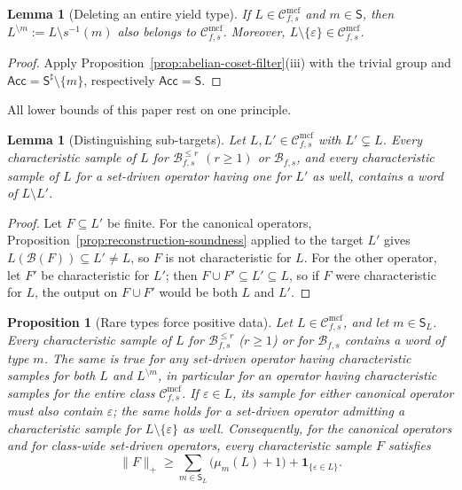 \documentclass[11pt]{article}
\numberwithin{equation}{section}
\theoremstyle{plain}
\newtheorem{lemma}[theorem]{Lemma}
\newtheorem{proposition}[theorem]{Proposition}
\theoremstyle{definition}
\theoremstyle{remark}
\newcommand{\Cmcf}[2]{\mathcal{C}^{\mathrm{mcf}}_{#1,#2}}
\newcommand{\eps}{\varepsilon}
\theoremstyle{plain}
\begin{document}
\begin{lemma}[Deleting an entire yield type]
\label{lem:type-deletion}
If $L\in\Cmcf{f}{s}$ and $m\in\mathsf S$, then
$L^{\setminus m}:=L\setminus s^{-1}(m)$ also belongs to
$\Cmcf{f}{s}$. Moreover, $L\setminus\{\eps\}\in\Cmcf{f}{s}$.
\end{lemma}

\begin{proof}
Apply Proposition~\ref{prop:abelian-coset-filter}(iii) with the trivial group and
$\mathsf{Acc}=\mathsf S^\sharp\setminus\{m\}$, respectively $\mathsf{Acc}=\mathsf S$.
\end{proof}

All lower bounds of this paper rest on one principle.

\begin{lemma}[Distinguishing sub-targets]
\label{lem:distinguishing}
Let $L,L'\in\Cmcf{f}{s}$ with $L'\subsetneq L$.  Every characteristic sample of
$L$ for $\mathcal B^{\le r}_{f,s}$ $(r\ge1)$ or $\mathcal B_{f,s}$, and every
characteristic sample of $L$ for a set-driven operator having one for $L'$ as
well, contains a word of $L\setminus L'$.
\end{lemma}

\begin{proof}
Let $F\subseteq L'$ be finite.  For the canonical operators,
Proposition~\ref{prop:reconstruction-soundness} applied to the target $L'$ gives
$L(\mathcal B(F))\subseteq L'\ne L$, so $F$ is not characteristic for $L$.  For the
other operator, let $F'$ be characteristic for $L'$; then
$F\cup F'\subseteq L'\subseteq L$, so if $F$ were characteristic for $L$, the output
on $F\cup F'$ would be both $L$ and $L'$.
\end{proof}

\begin{proposition}[Rare types force positive data]
\label{prop:rare-type}
Let $L\in\Cmcf{f}{s}$, and let $m\in \mathsf S_L$.
Every characteristic sample of $L$ for
$\mathcal B^{\le r}_{f,s}$ ($r\ge1$) or for $\mathcal B_{f,s}$
contains a word of type $m$. The same is true for any set-driven
operator having characteristic samples for both $L$ and
$L^{\setminus m}$, in particular for an operator having
characteristic samples for the entire class $\Cmcf{f}{s}$.
If $\eps\in L$, its sample for either canonical operator must
also contain $\eps$; the same holds for a set-driven operator admitting
a characteristic sample for $L\setminus\{\eps\}$ as well.
Consequently, for the canonical operators and for class-wide
set-driven operators, every characteristic sample $F$ satisfies
\[
 \|F\|_+\ge
 \sum_{m\in \mathsf S_L}\bigl(\mu_m(L)+1\bigr)
 +\mathbf 1_{\{\eps\in L\}}.
\]
\end{proposition}
\end{document}
